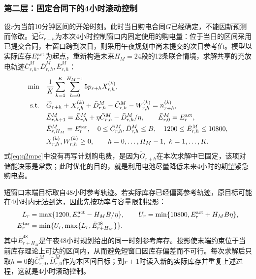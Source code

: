 \documentclass[UTF8,fontset=none,12pt,a4paper]{ctexart}
\begin{document}
\subsubsection{第二层：固定合同下的4小时滚动控制}
设$r$为当前10分钟区间的开始时刻。此时当日购电合同$G$已经确定，不能因新预测而修改。记$\widetilde G_{r+h}$为本次4小时控制窗口内固定使用的购电量：位于当日的区间采用已提交合同，若窗口跨到次日，则采用午夜规划中尚未提交的次日参考值。模型以实际库存$E_r^{\rm act}$为起点，重新构造未来$H_M=24$段的12条联合情境，求解共享的充放电轨迹$\bar C_{r,h}^{M},\bar D_{r,h}^{M},\bar E_{r,h}^{M}$：
\begin{align}
 \min\quad
 &\frac1K\sum_{k=1}^{K}\sum_{h=0}^{H_M-1}5p_{r+h}X_{r,h}^{(k)},\label{eq:q2mpc}\\
 \text{s.t.}\quad
 &\widetilde G_{r+h}+X_{r,h}^{(k)}+\bar D_{r,h}^{M}-\bar C_{r,h}^{M}-W_{r,h}^{(k)}
 =n_{r+h}^{(k)},\nonumber\\
 &\bar E_{r,h+1}^{M}=\bar E_{r,h}^{M}
 +\eta\bar C_{r,h}^{M}-\bar D_{r,h}^{M}/\eta,\qquad
 \bar E_{r,0}^{M}=E_r^{\rm act},\nonumber\\
 &\bar E_{r,H_M}^{M}=E_r^{\rm tar},
 \quad 0\le\bar C_{r,h}^{M},\bar D_{r,h}^{M}\le B,
 \quad1200\le\bar E_{r,h}^{M}\le10800,\nonumber\\
 &X_{r,h}^{(k)},W_{r,h}^{(k)}\ge0,
 \qquad h=0,\ldots,H_M-1,\ k=1,\ldots,K.\nonumber
\end{align}
式\eqref{eq:q2mpc}中没有再写计划购电费，是因为$\widetilde G_{r+h}$在本次求解中已固定，该项对储能决策是常数；此时优化的目的，就是利用电池尽量降低未来4小时的期望紧急购电费。

短窗口末端目标取自48小时参考轨迹。若实际库存已经偏离参考轨迹，原目标可能在4小时内无法到达，因此先按功率与容量限制投影：
\begin{align}
 L_r&=\max\{1200,E_r^{\rm act}-H_MB/\eta\},\qquad
 U_r=\min\{10800,E_r^{\rm act}+H_MB\eta\},\nonumber\\
 E_r^{\rm tar}&=\min\{U_r,\max\{L_r,\bar E_{r+H_M}^{48}\}\}.
 \label{eq:q2mpc-terminal}
\end{align}
其中$\bar E_{r+H_M}^{48}$是午夜48小时规划给出的同一时刻参考库存。投影使末端约束位于当前库存理论上可达的区间内，从而避免短窗口因库存偏差而不可行。每次求解后只取$h=0$的$\bar C_{r,0}^{M},\bar D_{r,0}^{M}$作为本区间目标；到$r+1$时读入新的实际库存并重复上述过程，这就是4小时滚动控制。
\end{document}
